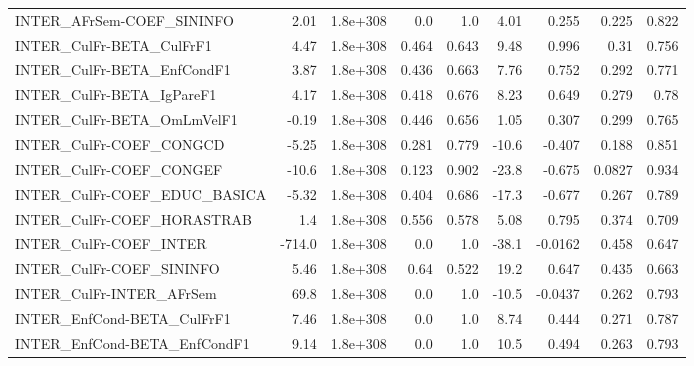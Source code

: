 \begin{tabular}{lrrrrrrrr}
INTER\_AFrSem-COEF\_SININFO             &        2.01 &     1.8e+308 &      0.0 &      1.0 &       4.01 &       0.255 &        0.225 &         0.822 \\
INTER\_CulFr-BETA\_CulFrF1              &        4.47 &     1.8e+308 &    0.464 &    0.643 &       9.48 &       0.996 &         0.31 &         0.756 \\
INTER\_CulFr-BETA\_EnfCondF1            &        3.87 &     1.8e+308 &    0.436 &    0.663 &       7.76 &       0.752 &        0.292 &         0.771 \\
INTER\_CulFr-BETA\_IgPareF1             &        4.17 &     1.8e+308 &    0.418 &    0.676 &       8.23 &       0.649 &        0.279 &          0.78 \\
INTER\_CulFr-BETA\_OmLmVelF1            &       -0.19 &     1.8e+308 &    0.446 &    0.656 &       1.05 &       0.307 &        0.299 &         0.765 \\
INTER\_CulFr-COEF\_CONGCD               &       -5.25 &     1.8e+308 &    0.281 &    0.779 &      -10.6 &      -0.407 &        0.188 &         0.851 \\
INTER\_CulFr-COEF\_CONGEF               &       -10.6 &     1.8e+308 &    0.123 &    0.902 &      -23.8 &      -0.675 &       0.0827 &         0.934 \\
INTER\_CulFr-COEF\_EDUC\_BASICA          &       -5.32 &     1.8e+308 &    0.404 &    0.686 &      -17.3 &      -0.677 &        0.267 &         0.789 \\
INTER\_CulFr-COEF\_HORASTRAB            &         1.4 &     1.8e+308 &    0.556 &    0.578 &       5.08 &       0.795 &        0.374 &         0.709 \\
INTER\_CulFr-COEF\_INTER                &      -714.0 &     1.8e+308 &      0.0 &      1.0 &      -38.1 &     -0.0162 &        0.458 &         0.647 \\
INTER\_CulFr-COEF\_SININFO              &        5.46 &     1.8e+308 &     0.64 &    0.522 &       19.2 &       0.647 &        0.435 &         0.663 \\
INTER\_CulFr-INTER\_AFrSem              &        69.8 &     1.8e+308 &      0.0 &      1.0 &      -10.5 &     -0.0437 &        0.262 &         0.793 \\
INTER\_EnfCond-BETA\_CulFrF1            &        7.46 &     1.8e+308 &      0.0 &      1.0 &       8.74 &       0.444 &        0.271 &         0.787 \\
INTER\_EnfCond-BETA\_EnfCondF1          &        9.14 &     1.8e+308 &      0.0 &      1.0 &       10.5 &       0.494 &        0.263 &         0.793 \\

\end{tabular}
